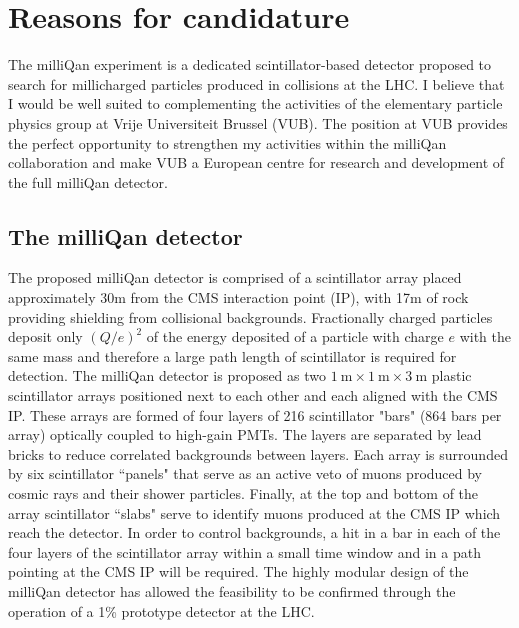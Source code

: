 \documentclass[11pt]{article}
\theoremstyle{plain} \numberwithin{equation}{section}
\theoremstyle{definition}
\begin{document}
\section*{Reasons for candidature}
\noindent 

The milliQan experiment is a dedicated scintillator-based detector
proposed to search for millicharged particles produced in collisions
at the LHC. I believe that I would be well suited to complementing the activities of the 
elementary particle physics group at Vrije Universiteit Brussel (VUB). 
The position at VUB provides the perfect opportunity to
strengthen my activities within the milliQan collaboration and make VUB a European centre
for research and development of the full milliQan detector.

\subsection*{The milliQan detector}

The proposed milliQan detector is comprised of a scintillator array placed
approximately 30m from the CMS interaction point (IP), 
with 17m of rock providing shielding from collisional backgrounds. 
Fractionally charged particles deposit only $(Q/e)^2$ of the energy 
deposited of a particle with charge $e$ with 
the same mass and therefore a large path length of scintillator is required for
detection. The milliQan detector is proposed as two 
$1~\mathrm{m}\times1~\mathrm{m}\times3~\mathrm{m}$ plastic scintillator arrays 
positioned next to each other and each aligned with the CMS IP.
These arrays are formed of four layers of 216 scintillator "bars" 
(864 bars per array) optically coupled to high-gain PMTs. The layers are 
separated by lead bricks to reduce correlated backgrounds 
between layers. Each array is surrounded by six 
scintillator ``panels" that serve as an active veto of muons produced 
by cosmic rays and their shower particles. Finally, at the top and bottom of the array
scintillator ``slabs" serve to identify muons produced at the CMS IP which
reach the detector. In order to control backgrounds, a hit in a bar in each of the four layers 
of the scintillator array within a small time 
window and in a path pointing at the CMS IP will be required. 
The highly modular design of the milliQan detector has allowed the feasibility 
to be confirmed through the operation of a 1\% prototype detector at the LHC.
\end{document}
